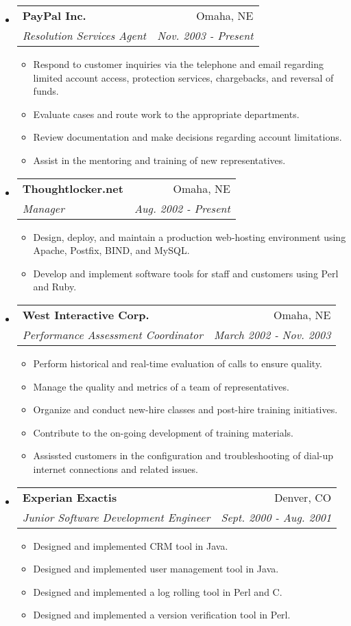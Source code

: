 \documentclass[letterpaper,11pt]{article}
\makeatletter
\newcommand{\resitem}[1]{\item #1 \vspace{-2pt}}
\newcommand{\resheading}[1]{{\large \parashade[.8]{sharpcorners}{\textbf{#1 \vphantom{p\^{E}}}}}}
\newcommand{\ressubheading}[4]{
\begin{tabular*}{6.5in}{l@{\extracolsep{\fill}}r}
  \textbf{#1} & #2 \\
  \textit{#3} & \textit{#4} \\
\end{tabular*}\vspace{-6pt}}
\makeatother
\begin{document}
\resheading{Work Experience}
\begin{itemize}

\item
  \ressubheading{PayPal Inc.}{Omaha, NE}
  {Resolution Services Agent}{Nov. 2003 - Present}
  \begin{itemize}
    \resitem{Respond to customer inquiries via the telephone and email
      regarding limited account access, protection services, chargebacks, and
      reversal of funds.}
    \resitem{Evaluate cases and route work to the appropriate departments.}
    \resitem{Review documentation and make decisions regarding account
      limitations.}
    \resitem{Assist in the mentoring and training of new representatives.}
  \end{itemize}

\item
  \ressubheading{Thoughtlocker.net}{Omaha, NE}
  {Manager}{Aug. 2002 - Present}
  \begin{itemize}
    \resitem{Design, deploy, and maintain a production web-hosting
      environment using Apache, Postfix, BIND, and MySQL.}
    \resitem{Develop and implement software tools for staff and
      customers using Perl and Ruby.}
  \end{itemize}

\item
  \ressubheading{West Interactive Corp.}{Omaha, NE}
  {Performance Assessment Coordinator}{March 2002 - Nov. 2003}
  \begin{itemize}
    \resitem{Perform historical and real-time evaluation of calls to
      ensure quality.}
    \resitem{Manage the quality and metrics of a team of
      representatives.}
    \resitem{Organize and conduct new-hire classes and post-hire
      training initiatives.}
    \resitem{Contribute to the on-going development of training
      materials.}
    \resitem{Assissted customers in the configuration and
      troubleshooting of dial-up internet connections and related
      issues.}
  \end{itemize}


\item
  \ressubheading{Experian Exactis}{Denver, CO}
  {Junior Software Development Engineer}{Sept. 2000 - Aug. 2001}
  \begin{itemize}
    \resitem{Designed and implemented CRM tool in Java.}
    \resitem{Designed and implemented user management tool in Java.}
    \resitem{Designed and implemented a log rolling tool in Perl and
      C.}
    \resitem{Designed and implemented a version verification tool in
      Perl.}
  \end{itemize}

\end{itemize}
\end{document}
